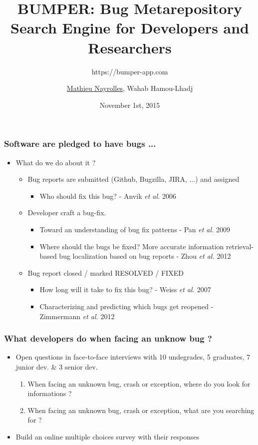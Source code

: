 \documentclass{beamer}
\title[BUMPER]{BUMPER: Bug Metarepository Search Engine for Developers and Researchers} %
\subtitle{https://bumper-app.com}
\author[Mathieu Nayrolles]{\underline{Mathieu Nayrolles}, Wahab Hamou-Lhadj} %
\institute[Concordia] %
{
Software Behaviour Analysis (SBA) Research Lab, ECE,  Concordia, Montr\'eal, Canada
\medskip
\textit{mathieu.nayrolles@gmail.com, wahab.hamou-lhadj@concordia.ca} %
}
\date{November 1st, 2015} %
\begin{document}
\begin{frame}
\titlepage %
\end{frame}


\begin{frame}
\frametitle{Software are pledged to have bugs ... }


\vspace{0.3cm}
\begin{itemize}
\item What do we do about it ?
\vspace{0.3cm}
\begin{itemize}
\vspace{0.3cm}
\item Bug reports are submitted (Github, Bugzilla, JIRA, ...) and assigned
\begin{itemize}
\item Who should fix this bug? - Anvik \textit{et al.} 2006
\end{itemize}
\item Developer craft a bug-fix.
\begin{itemize}
\item Toward an understanding of bug fix patterns - Pan \textit{et al.} 2009
\item Where should the bugs be fixed? More accurate information retrieval-based bug localization based on bug reports - Zhou \textit{et al.} 2012
\end{itemize}
\item Bug report closed / marked RESOLVED / FIXED
\begin{itemize}
\item How long will it take to fix this bug? - Weiss \textit{et al.} 2007
\item Characterizing and predicting which bugs get reopened - Zimmermann \textit{et al.} 2012
\end{itemize}
\end{itemize}
\end{itemize}
\end{frame}



\begin{frame}
\frametitle{What developers do when facing an unknow bug ?}

\begin{itemize}
\item Open questions in face-to-face interviews with 10 undegrades, 5 graduates, 7 junior dev. \& 3 senior dev.


\begin{enumerate}
  \item When facing an unknown bug, crash or exception, where do you look for informations ?
  \item When facing an unknown bug, crash or exception, what are you searching for ?
\end{enumerate}


\item Build an online multiple choices survey with their responses

\end{itemize}

\end{frame}
\end{document}
